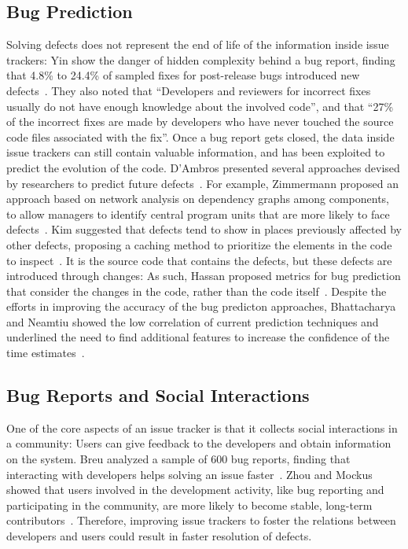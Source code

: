 


\subsection{Bug Prediction}

Solving defects does not represent the end of life of the information inside issue trackers: Yin \etal show the danger of hidden complexity behind a bug report, finding that 4.8\% to 24.4\% of sampled fixes for post-release bugs introduced new defects~\cite{Yin2011a}.
They also noted that ``Developers and reviewers for incorrect fixes usually do not have enough knowledge about the involved code'', and that ``27\% of the incorrect fixes are made by developers who have never touched the source code files associated with the fix''.
Once a bug report gets closed, the data inside issue trackers can still contain valuable information, and has been exploited to predict the evolution of the code.
D'Ambros \etal presented several approaches devised by researchers to predict future defects~\cite{DAmb2012a}.
For example, Zimmermann \etal proposed an approach based on network analysis on dependency graphs among components, to allow managers to identify central program units that are more likely to face defects~\cite{Zimm2008a}.
Kim \etal suggested that defects tend to show in places previously affected by other defects, proposing a caching method to prioritize the elements in the code to inspect~\cite{Kim2007a}.
It is the source code that contains the defects, but these defects are introduced through changes: As such, Hassan \etal proposed metrics for bug prediction that consider the changes in the code, rather than the code itself~\cite{Hass2009a}.
Despite the efforts in improving the accuracy of the bug predicton approaches, Bhattacharya and Neamtiu showed the low correlation of current prediction techniques and underlined the need to find additional features to increase the confidence of the time estimates~\cite{Bhat2011}.


\subsection{Bug Reports and Social Interactions}

One of the core aspects of an issue tracker is that it collects social interactions in a community: Users can give feedback to the developers and obtain information on the system.
Breu \etal analyzed a sample of 600 bug reports, finding that interacting with developers helps solving an issue faster~\cite{Breu2010}.
Zhou and Mockus showed that users involved in the development activity, like bug reporting and participating in the community, are more likely to become stable, long-term contributors~\cite{Zhou2015}.
Therefore, improving issue trackers to foster the relations between developers and users could result in faster resolution of defects.


